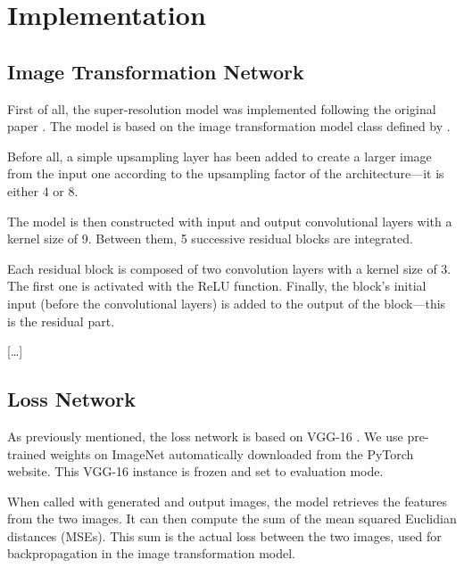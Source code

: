 \documentclass{article}
\begin{document}
{
    \section{Implementation}
    \label{sec:implementation}

    \subsection{Image Transformation Network}
    \label{subsec:image-transformation-network-implementation}

    First of all, the super-resolution model was implemented following the original paper \citep{sr}. The model is based on the image transformation model class defined by \cite{image-transform-network}.

    \bigskip

    Before all, a simple upsampling layer has been added to create a larger image from the input one according to the upsampling factor of the architecture—it is either 4 or 8.

    The model is then constructed with input and output convolutional layers with a kernel size of 9. Between them, 5 successive residual blocks \citep{residual} are integrated.

    Each residual block is composed of two convolution layers with a kernel size of 3. The first one is activated with the ReLU function. Finally, the block's initial input (before the convolutional layers) is added to the output of the block---this is the residual part.

    \bigskip

    […]

    \subsection{Loss Network}
    \label{subsec:loss-network-implementation}

    As previously mentioned, the loss network is based on VGG-16 \citep{vgg}. We use pre-trained weights on ImageNet \citep{image-net} automatically downloaded from the PyTorch website. This VGG-16 instance is frozen and set to evaluation mode.

    \bigskip

    When called with generated and output images, the model retrieves the features from the two images. It can then compute the sum of the mean squared Euclidian distances (MSEs). This sum is the actual loss between the two images, used for backpropagation in the image transformation model.

}
\end{document}
